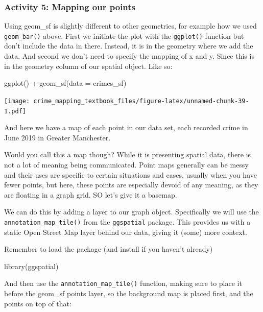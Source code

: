 \documentclass[
]{book}
\newenvironment{Shaded}{\begin{snugshade}}{\end{snugshade}}
\newcommand{\AttributeTok}[1]{\textcolor[rgb]{0.77,0.63,0.00}{#1}}
\newcommand{\FunctionTok}[1]{\textcolor[rgb]{0.00,0.00,0.00}{#1}}
\newcommand{\NormalTok}[1]{#1}
\newcommand{\SpecialCharTok}[1]{\textcolor[rgb]{0.00,0.00,0.00}{#1}}
\begin{document}
\hypertarget{activity-5-mapping-our-points}{%
\subsubsection{Activity 5: Mapping our points}\label{activity-5-mapping-our-points}}

Using geom\_sf is slightly different to other geometries, for example how we used \texttt{geom\_bar()} above. First we initiate the plot with the \texttt{ggplot()} function but don't include the data in there. Instead, it is in the geometry where we add the data. And second we don't need to specify the mapping of x and y. Since this is in the geometry column of our spatial object. Like so:

\begin{Shaded}
\begin{Highlighting}[]
\FunctionTok{ggplot}\NormalTok{() }\SpecialCharTok{+} 
  \FunctionTok{geom\_sf}\NormalTok{(}\AttributeTok{data =}\NormalTok{ crimes\_sf)}
\end{Highlighting}
\end{Shaded}

\texttt{[image: crime\_mapping\_textbook\_files/figure-latex/unnamed-chunk-39-1.pdf]}

And here we have a map of each point in our data set, each recorded crime in June 2019 in Greater Manchester.

Would you call this a map though? While it is presenting spatial data, there is not a lot of meaning being communicated. Point maps generally can be messy and their uses are specific to certain situations and cases, usually when you have fewer points, but here, these points are especially devoid of any meaning, as they are floating in a graph grid. SO let's give it a basemap.

We can do this by adding a layer to our graph object. Specifically we will use the \texttt{annotation\_map\_tile()} from the \texttt{ggspatial} package. This provides us with a static Open Street Map layer behind our data, giving it (some) more context.

Remember to load the package (and install if you haven't already)

\begin{Shaded}
\begin{Highlighting}[]
\FunctionTok{library}\NormalTok{(ggspatial)}
\end{Highlighting}
\end{Shaded}

And then use the \texttt{annotation\_map\_tile()} function, making sure to place it before the geom\_sf points layer, so the background map is placed first, and the points on top of that:
\end{document}

